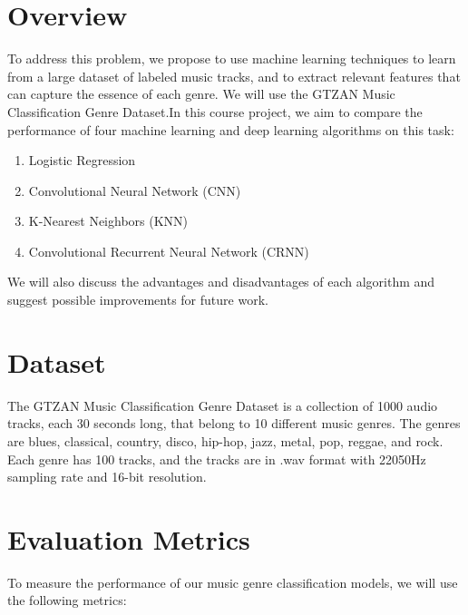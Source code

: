 \documentclass[conference]{IEEEtran}
\begin{document}
    

    \section{Overview}
        To address this problem, we propose to use machine learning techniques to learn from a large dataset of labeled music tracks, and to extract relevant features that can capture the essence of each genre. We will use the GTZAN Music Classification Genre Dataset.In this course project, we aim to compare the performance of four machine learning and deep learning algorithms on this task:
    \begin{enumerate}
        \item Logistic Regression
        \item Convolutional Neural Network (CNN)
        \item K-Nearest Neighbors (KNN)
        \item Convolutional Recurrent Neural Network (CRNN)
    \end{enumerate}

    We will also discuss the advantages and disadvantages of each algorithm and suggest possible improvements for future work.


    \section{Dataset}
        The GTZAN Music Classification Genre Dataset is a collection of 1000 audio tracks, each 30 seconds long, that belong to 10 different music genres. The genres are blues, classical, country, disco, hip-hop, jazz, metal, pop, reggae, and rock. Each genre has 100 tracks, and the tracks are in .wav format with 22050Hz sampling rate and 16-bit resolution.

    \section*{Evaluation Metrics} 
        To measure the performance of our music genre classification models, we will use the following metrics:
        
\end{document}
